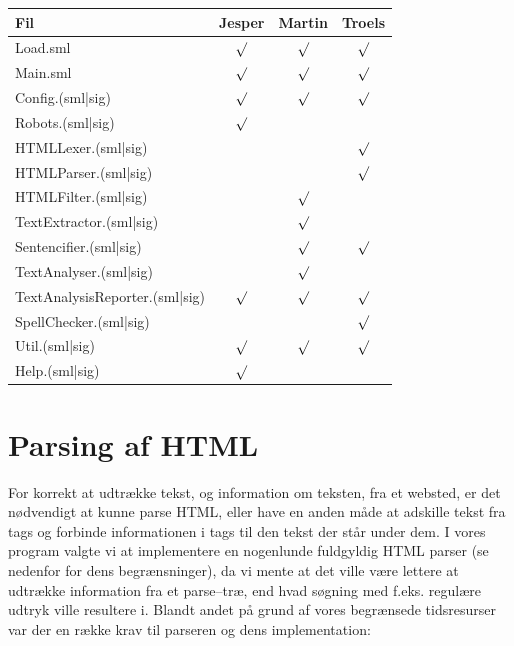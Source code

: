 \documentclass[a4paper,oneside]{memoir}
\begin{document}
\begin{longtable}{l|c|c|c}
\textbf{Fil} &
\textbf{Jesper} &
\textbf{Martin} &
\textbf{Troels} \\ \hline
Load.sml & $\surd$ & $\surd$ & $\surd$ \\ \hline
Main.sml & $\surd$ & $\surd$ & $\surd$ \\ \hline
Config.(sml|sig) & $\surd$ & $\surd$ & $\surd$ \\ \hline
Robots.(sml|sig) & $\surd$ & & \\ \hline
HTMLLexer.(sml|sig) & & & $\surd$ \\ \hline
HTMLParser.(sml|sig) & & & $\surd$ \\ \hline
HTMLFilter.(sml|sig) & & $\surd$ & \\ \hline
TextExtractor.(sml|sig) & & $\surd$ & \\ \hline
Sentencifier.(sml|sig) & & $\surd$ & $\surd$ \\ \hline
TextAnalyser.(sml|sig) & & $\surd$ & \\ \hline
TextAnalysisReporter.(sml|sig) & $\surd$ & $\surd$ & $\surd$ \\ \hline
SpellChecker.(sml|sig) & & & $\surd$ \\ \hline
Util.(sml|sig) & $\surd$ & $\surd$ & $\surd$ \\ \hline
Help.(sml|sig) & $\surd$ & & \\ \hline
\end{longtable}

\section{Parsing af HTML}
\label{htmlparserimpl}
For korrekt at udtrække tekst, og information om teksten, fra et
websted, er det nødvendigt at kunne parse HTML, eller have en anden
måde at adskille tekst fra tags og forbinde informationen i tags til
den tekst der står under dem. I vores program valgte vi at
implementere en nogenlunde fuldgyldig HTML parser (se nedenfor for
dens begrænsninger), da vi mente at det ville være lettere at udtrække
information fra et parse--træ, end hvad søgning med f.eks. regulære
udtryk ville resultere i. Blandt andet på grund af vores begrænsede
tidsresurser var der en række krav til parseren og dens
implementation:
\end{document}
